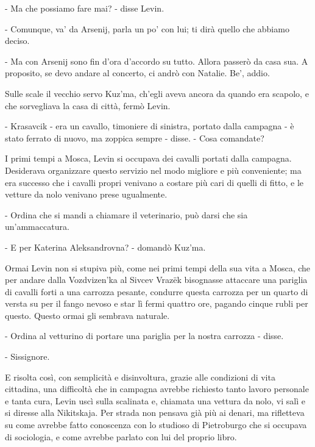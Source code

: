 - Ma che possiamo fare mai? - disse Levin. 

- Comunque, va' da Arsenij, parla un po' con lui; ti dirà quello che abbiamo deciso. 

- Ma con Arsenij sono fin d'ora d'accordo su tutto. Allora passerò da casa sua. A proposito, se devo andare al concerto, ci andrò con Natalie. Be', addio. 

Sulle scale il vecchio servo Kuz'ma, ch'egli aveva ancora da quando era scapolo, e che sorvegliava la casa di città, fermò Levin. 

- Krasavcik - era un cavallo, timoniere di sinistra, portato dalla campagna - è stato ferrato di nuovo, ma zoppica sempre - disse. - Cosa comandate? 

I primi tempi a Mosca, Levin si occupava dei cavalli portati dalla campagna. Desiderava organizzare questo servizio nel modo migliore e più conveniente; ma era successo che i cavalli propri venivano a costare più cari di quelli di fitto, e le vetture da nolo venivano prese ugualmente. 

- Ordina che si mandi a chiamare il veterinario, può darsi che sia un'ammaccatura. 

- E per Katerina Aleksandrovna? - domandò Kuz'ma. 

Ormai Levin non si stupiva più, come nei primi tempi della sua vita a Mosca, che per andare dalla Vozdvizen'ka al Sivcev Vrazëk bisognasse attaccare una pariglia di cavalli forti a una carrozza pesante, condurre questa carrozza per un quarto di versta su per il fango nevoso e star lì fermi quattro ore, pagando cinque rubli per questo. Questo ormai gli sembrava naturale. 

- Ordina al vetturino di portare una pariglia per la nostra carrozza - disse. 

- Sissignore. 

E risolta così, con semplicità e disinvoltura, grazie alle condizioni di vita cittadina, una difficoltà che in campagna avrebbe richiesto tanto lavoro personale e tanta cura, Levin uscì sulla scalinata e, chiamata una vettura da nolo, vi salì e si diresse alla Nikitskaja. Per strada non pensava già più ai denari, ma rifletteva su come avrebbe fatto conoscenza con lo studioso di Pietroburgo che si occupava di sociologia, e come avrebbe parlato con lui del proprio libro. 

